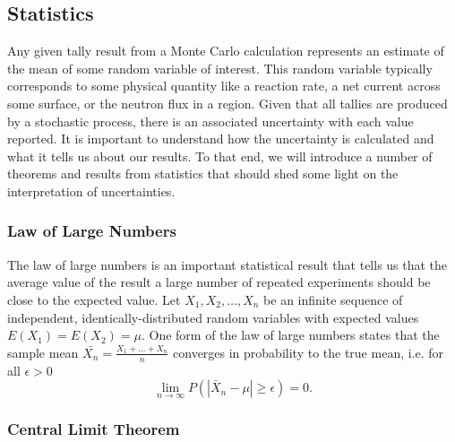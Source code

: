 \subsection{Statistics}

Any given tally result from a Monte Carlo calculation represents an estimate of
the mean of some random variable of interest. This random variable typically
corresponds to some physical quantity like a reaction rate, a net current across
some surface, or the neutron flux in a region. Given that all tallies are
produced by a stochastic process, there is an associated uncertainty with each
value reported. It is important to understand how the uncertainty is calculated
and what it tells us about our results. To that end, we will introduce a number
of theorems and results from statistics that should shed some light on the
interpretation of uncertainties.

\subsubsection{Law of Large Numbers}

The law of large numbers is an important statistical result that tells us that
the average value of the result a large number of repeated experiments should be
close to the expected value. Let $X_1, X_2, \dots, X_n$ be an infinite sequence
of independent, identically-distributed random variables with expected values
$E(X_1) = E(X_2) = \mu$. One form of the law of large numbers states that the
sample mean $\bar{X_n} = \frac{X_1 + \dots + X_n}{n}$ converges in probability
to the true mean, i.e. for all $\epsilon > 0$
\begin{equation}
    \lim\limits_{n\rightarrow\infty} P \left ( \left | \bar{X}_n - \mu \right |
    \ge \epsilon \right ) = 0.
\end{equation}

\subsubsection{Central Limit Theorem}
\label{sec:central-limit-theorem}

